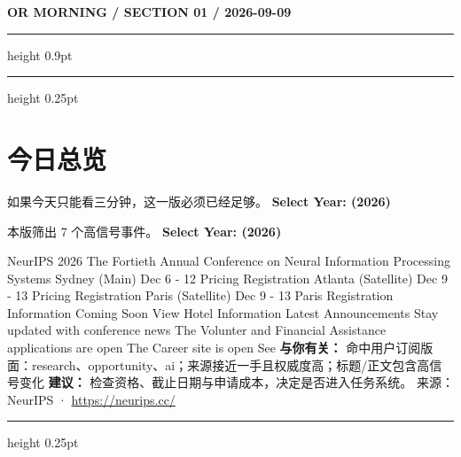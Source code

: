 \documentclass[10.5pt]{ctexart}
\begin{document}
{\small\bfseries OR MORNING / SECTION 01 / 2026-09-09}
\vspace{2mm}
\hrule height 0.9pt
\vspace{1.5mm}
\hrule height 0.25pt
\vspace{4mm}
\section*{今日总览}
{\color{ormuted} 如果今天只能看三分钟，这一版必须已经足够。}
\vspace{2mm}
{\fontsize{25}{29}\selectfont\bfseries Select Year: (2026)}\par
\vspace{2mm}
{\large 本版筛出 7 个高信号事件。}
\vspace{3mm}
{\Large\bfseries Select Year: (2026)}\par
NeurIPS 2026 The Fortieth Annual Conference on Neural Information Processing Systems Sydney (Main) Dec 6 - 12 Pricing Registration Atlanta (Satellite) Dec 9 - 13 Pricing Registration Paris (Satellite) Dec 9 - 13 Paris Registration Information Coming Soon View Hotel Information Latest Announcements Stay updated with conference news The Volunter and Financial Assistance applications are open The Career site is open See
\textbf{与你有关：} 命中用户订阅版面：research、opportunity、ai；来源接近一手且权威度高；标题/正文包含高信号变化
\textbf{建议：} 检查资格、截止日期与申请成本，决定是否进入任务系统。
{\footnotesize\color{ormuted} 来源：NeurIPS · \url{https://neurips.cc/}}
\vspace{3mm}
\hrule height 0.25pt
\vspace{3mm}
\end{document}
